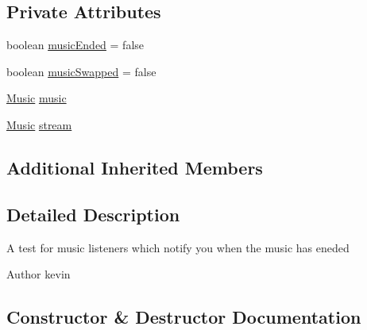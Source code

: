 \subsection*{Private Attributes}
\begin{DoxyCompactItemize}
\item 
boolean \mbox{\hyperlink{classorg_1_1newdawn_1_1slick_1_1tests_1_1_music_listener_test_ad701c702ddf8e4f55e1d6e2b9e8b25c7}{music\+Ended}} = false
\item 
boolean \mbox{\hyperlink{classorg_1_1newdawn_1_1slick_1_1tests_1_1_music_listener_test_a00672f601ac67a12c1fb5218a89b1a6c}{music\+Swapped}} = false
\item 
\mbox{\hyperlink{classorg_1_1newdawn_1_1slick_1_1_music}{Music}} \mbox{\hyperlink{classorg_1_1newdawn_1_1slick_1_1tests_1_1_music_listener_test_a3548ac70c36c26e6f4215ab5f4ef9821}{music}}
\item 
\mbox{\hyperlink{classorg_1_1newdawn_1_1slick_1_1_music}{Music}} \mbox{\hyperlink{classorg_1_1newdawn_1_1slick_1_1tests_1_1_music_listener_test_a9e428dbc6b297edff18908dec9c9a305}{stream}}
\end{DoxyCompactItemize}
\subsection*{Additional Inherited Members}


\subsection{Detailed Description}
A test for music listeners which notify you when the music has eneded

\begin{DoxyAuthor}{Author}
kevin 
\end{DoxyAuthor}


\subsection{Constructor \& Destructor Documentation}
\mbox{\label{classorg_1_1newdawn_1_1slick_1_1tests_1_1_music_listener_test_a7417ff7ac4e26a349ed7483f97f46641}} 
